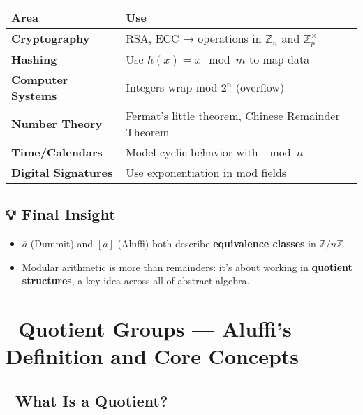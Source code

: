 \documentclass[
]{article}
\providecommand{\tightlist}{%
  \setlength{\itemsep}{0pt}\setlength{\parskip}{0pt}}
\begin{document}
\begin{longtable}[]{@{}
  >{\raggedright\arraybackslash}p{}
  >{\raggedright\arraybackslash}p{}@{}}
\toprule\noalign{}
\begin{minipage}[b]{\linewidth}\raggedright
Area
\end{minipage} & \begin{minipage}[b]{\linewidth}\raggedright
Use
\end{minipage} \\
\midrule\noalign{}
\endhead
\bottomrule\noalign{}
\endlastfoot
\textbf{Cryptography} & RSA, ECC → operations in \(\mathbb{Z}_n\) and
\(\mathbb{Z}_p^\times\) \\
\textbf{Hashing} & Use \(h(x) = x \mod m\) to map data \\
\textbf{Computer Systems} & Integers wrap mod \(2^n\) (overflow) \\
\textbf{Number Theory} & Fermat's little theorem, Chinese Remainder
Theorem \\
\textbf{Time/Calendars} & Model cyclic behavior with \(\mod n\) \\
\textbf{Digital Signatures} & Use exponentiation in mod fields \\
\end{longtable}

\subsection{💡 Final Insight}\label{final-insight}

\begin{itemize}
\tightlist
\item
  \(\overline{a}\) (Dummit) and \([a]\) (Aluffi) both describe
  \textbf{equivalence classes} in \(\mathbb{Z}/n\mathbb{Z}\)
\item
  Modular arithmetic is more than remainders: it's about working in
  \textbf{quotient structures}, a key idea across all of abstract
  algebra.
\end{itemize}

\section{🧮 Quotient Groups --- Aluffi's Definition and Core
Concepts}\label{quotient-groups-aluffis-definition-and-core-concepts}

\subsection{🔧 What Is a Quotient?}\label{what-is-a-quotient}
\end{document}
